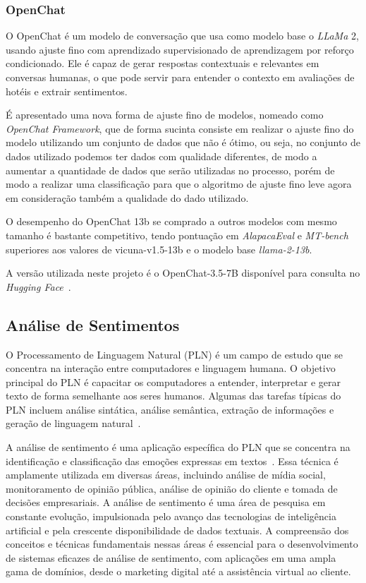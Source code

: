 \subsubsection{OpenChat}
\label{cap:fund_teorica:sec:modelos:subsec:openchat}

O OpenChat \cite{wang2024openchat} é um modelo de conversação que usa como modelo base o \textit{LLaMa} 2, usando ajuste fino com aprendizado supervisionado de aprendizagem por reforço condicionado. Ele é capaz de gerar respostas contextuais e relevantes em conversas humanas, o que pode servir para entender o contexto em avaliações de hotéis e extrair sentimentos.

É apresentado uma nova forma de ajuste fino de modelos, nomeado como \textit{OpenChat Framework}, que de forma sucinta consiste em realizar o ajuste fino do modelo utilizando um conjunto de dados que não é ótimo, ou seja, no conjunto de dados utilizado podemos ter dados com qualidade diferentes, de modo a aumentar a quantidade de dados que serão utilizadas no processo, porém de modo a realizar uma classificação para que o algoritmo de ajuste fino leve agora em consideração também a qualidade do dado utilizado.

O desempenho do OpenChat 13b se comprado a outros modelos com mesmo tamanho é bastante competitivo, tendo pontuação em \textit{AlapacaEval} e \textit{MT-bench} superiores aos valores de vicuna-v1.5-13b e o modelo base \textit{llama-2-13b}.

A versão utilizada neste projeto é o OpenChat-3.5-7B disponível para consulta no \textit{Hugging Face}~\cite{openChat357b}.

\subsection{Análise de Sentimentos}
\label{cap:fund_teorica:sec:analise_sentimento}

O Processamento de Linguagem Natural (PLN) é um campo de estudo que se concentra na interação entre computadores e linguagem humana. O objetivo principal do PLN é capacitar os computadores a entender, interpretar e gerar texto de forma semelhante aos seres humanos. Algumas das tarefas típicas do PLN incluem análise sintática, análise semântica, extração de informações e geração de linguagem natural~\cite{anchieta2021pln}.

A análise de sentimento é uma aplicação específica do PLN que se concentra na identificação e classificação das emoções expressas em textos~\cite{Liu2012}. Essa técnica é amplamente utilizada em diversas áreas, incluindo análise de mídia social, monitoramento de opinião pública, análise de opinião do cliente e tomada de decisões empresariais. A análise de sentimento é uma área de pesquisa em constante evolução, impulsionada pelo avanço das tecnologias de inteligência artificial e pela crescente disponibilidade de dados textuais. A compreensão dos conceitos e técnicas fundamentais nessas áreas é essencial para o desenvolvimento de sistemas eficazes de análise de sentimento, com aplicações em uma ampla gama de domínios, desde o marketing digital até a assistência virtual ao cliente.

